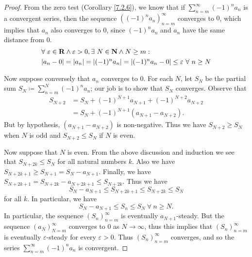 \begin{proof}
From the zero test (Corollary \ref{7.2.6}), we know that if \(\sum_{n = m}^\infty (-1)^n a_n\) is a convergent series, then the sequence \(((-1)^n a_n)_{n = m}^\infty\) converges to \(0\), which implies that \(a_n\) also converges to \(0\), since \((-1)^n a_n\) and \(a_n\) have the same distance from \(0\).
\begin{align*}
& \forall\ \varepsilon \in \mathbf{R} \land \varepsilon > 0, \exists\ N \in \mathbf{N} \land N \geq m : \\
& \abs*{a_n - 0} = \abs*{a_n} = \abs*{(-1)^n a_n} = \abs*{(-1)^n a_n - 0} \leq \varepsilon \ \forall\ n \geq N
\end{align*}

Now suppose conversely that \(a_n\) converges to \(0\).
For each \(N\), let \(S_N\) be the partial sum \(S_N \coloneqq \sum_{n = m}^N (-1)^n a_n\);
our job is to show that \(S_N\) converges.
Observe that
\begin{align*}
S_{N + 2} &= S_N + (-1)^{N + 1} a_{N + 1} + (-1)^{N + 2} a_{N + 2} \\
&= S_N + (-1)^{N + 1} (a_{N + 1} - a_{N + 2}).
\end{align*}
But by hypothesis, \((a_{N + 1} - a_{N + 2})\) is non-negative.
Thus we have \(S_{N + 2} \geq S_N\) when \(N\) is odd and \(S_{N + 2} \leq S_N\) if \(N\) is even.

Now suppose that \(N\) is even.
From the above discussion and induction we see that \(S_{N + 2k} \leq S_N\) for all natural numbers \(k\).
Also we have \(S_{N + 2k + 1} \geq S_{N + 1} = S_N - a_{N + 1}\).
Finally, we have \(S_{N + 2k + 1} = S_{N + 2k} - a_{N + 2k + 1} \leq S_{N + 2k}\).
Thus we have
\[
    S_N - a_{N + 1} \leq S_{N + 2k + 1} \leq S_{N + 2k} \leq S_N
\]
for all \(k\).
In particular, we have
\[
    S_N - a_{N + 1} \leq S_n \leq S_N \ \forall\ n \geq N.
\]
In particular, the sequence \((S_n)_{n = m}^\infty\) is eventually \(a_{N + 1}\)-steady.
But the sequence \((a_N)_{N = m}^\infty\) converges to \(0\) as \(N \to \infty\), thus this implies that \((S_n)_{n = m}^\infty\) is eventually \(\varepsilon\)-steady for every \(\varepsilon > 0\).
Thus \((S_n)_{n = m}^\infty\) converges, and so the series \(\sum_{n = m}^\infty (-1)^n a_n\) is convergent.
\end{proof}